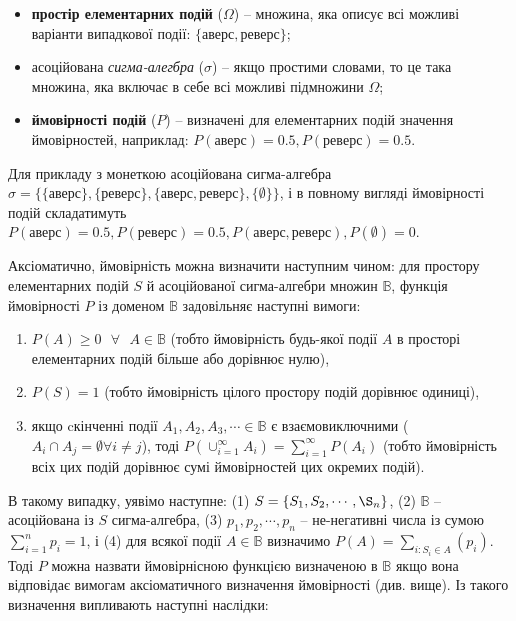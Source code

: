 \documentclass[
  11pt,
]{book}
\begin{document}
\begin{itemize}
\item
  \textbf{простір елементарних подій} (\(\Omega\)) -- множина, яка
  описує всі можливі варіанти випадкової події: \(\{аверс, реверс\}\);
\item
  асоційована \emph{сигма-алегбра} (\(\sigma\)) -- якщо простими
  словами, то це така множина, яка включає в себе всі можливі підмножини
  \(\Omega\);
\item
  \textbf{ймовірності подій} (\(P\)) -- визначені для елементарних подій
  значення ймовірностей, наприклад: \(P(аверс) = 0.5, P(реверс) = 0.5\).
\end{itemize}

Для прикладу з монеткою асоційована сигма-алгебра
\(\sigma = \{\{аверс\}, \{реверс\}, \{аверс, реверс\}, \{\emptyset\}\}\),
і в повному вигляді ймовірності подій складатимуть
\(P(аверс) = 0.5, P(реверс) = 0.5, P({аверс, реверс}), P(\emptyset) = 0\).

Аксіоматично, ймовірність можна визначити наступним чином: для простору
елементарних подій \(S\) й асоційованої сигма-алгебри множин
\(\mathbb{B}\), функція ймовірності \(P\) із доменом \(\mathbb{B}\)
задовільняє наступні вимоги:

\begin{enumerate}
\def\labelenumi{\arabic{enumi}.}
\item
  \(P(A) \geq 0 \text{ } \forall \text{ } A \in \mathbb{B}\) (тобто
  ймовірність будь-якої події \(A\) в просторі елементарних подій більше
  або дорівнює нулю),
\item
  \(P(S) = 1\) (тобто ймовірність цілого простору подій дорівнює
  одиниці),
\item
  якщо cкінченні події \(A_1, A_2, A_3, \cdots \in \mathbb{B}\) є
  взаємовиключними (\(A_i \cap A_j = \emptyset \forall i \neq j\)), тоді
  \(P(\cup_{i=1}^{\infty} A_i) = \sum_{i=1}^{\infty} P(A_i)\) (тобто
  ймовірність всіх цих подій дорівнює сумі ймовірностей цих окремих
  подій).
\end{enumerate}

В такому випадку, уявімо наступне: (1)
\(S = \{S_1, S_2, \cdots, \S_n\}\), (2) \(\mathbb{B}\) -- асоційована із
\(S\) сигма-алгебра, (3) \(p_1, p_2, \cdots, p_n\) -- не-негативні числа
із сумою \(\sum_{i=1}^n p_i = 1\), і (4) для всякої події
\(A \in \mathbb{B}\) визначимо \(P(A) = \sum_{i:S_i \in A}(p_i)\). Тоді
\(P\) можна назвати ймовірнісною функцією визначеною в \(\mathbb{B}\)
якщо вона відповідає вимогам аксіоматичного визначення ймовірності (див.
вище). Із такого визначення випливають наступні наслідки:
\end{document}
